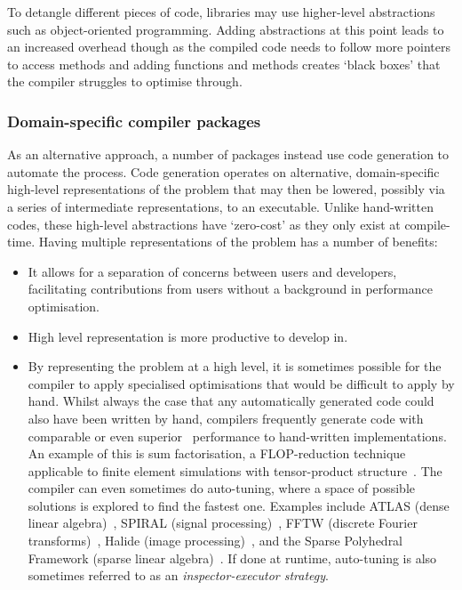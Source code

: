 \documentclass[thesis]{subfiles}
\begin{document}

To detangle different pieces of code, libraries may use higher-level abstractions such as object-oriented programming.
Adding abstractions at this point leads to an increased overhead though as the compiled code needs to follow more pointers to access methods and adding functions and methods creates `black boxes' that the compiler struggles to optimise through.

\subsubsection{Domain-specific compiler packages}

As an alternative approach, a number of packages instead use code generation to automate the process.
Code generation operates on alternative, domain-specific high-level representations of the problem that may then be lowered, possibly via a series of intermediate representations, to an executable.
Unlike hand-written codes, these high-level abstractions have `zero-cost' as they only exist at compile-time.
Having multiple representations of the problem has a number of benefits:

\begin{itemize}
  \item
    It allows for a separation of concerns between users and developers, facilitating contributions from users without a background in performance optimisation.
  \item
    High level representation is more productive to develop in.
  \item
    By representing the problem at a high level, it is sometimes possible for the compiler to apply specialised optimisations that would be difficult to apply by hand.
    Whilst always the case that any automatically generated code could also have been written by hand, compilers frequently generate code with comparable or even superior~\cite{ragan-kelleyHalideLanguageCompiler} performance to hand-written implementations.
    An example of this is sum factorisation, a FLOP-reduction technique applicable to finite element simulations with tensor-product structure~\cite{homolyaExposingExploitingStructure2017}.
    The compiler can even sometimes do auto-tuning, where a space of possible solutions is explored to find the fastest one.
    Examples include ATLAS (dense linear algebra)~\cite{whaleyAutomatedEmpiricalOptimizations2001}, SPIRAL (signal processing)~\cite{puschelSPIRALCodeGeneration2005}, FFTW (discrete Fourier transforms)~\cite{frigoDesignImplementationFFTW32005}, Halide (image processing)~\cite{ragan-kelleyHalideLanguageCompiler}, and the Sparse Polyhedral Framework (sparse linear algebra)~\cite{stroutSparsePolyhedralFramework2018}.
    If done at runtime, auto-tuning is also sometimes referred to as an \emph{inspector-executor strategy}.
\end{itemize}
\end{document}
